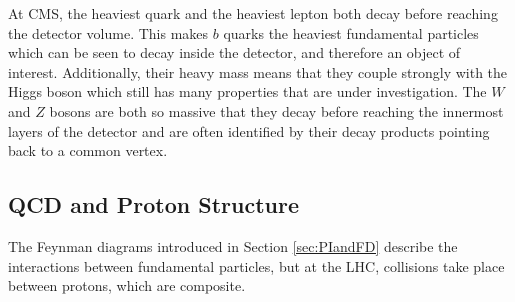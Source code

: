  At CMS, the heaviest quark and the heaviest
  lepton both decay before reaching
  the detector volume.
 This makes $b$ quarks the heaviest
  fundamental particles which can be seen
  to decay inside the detector,
  and therefore an object of interest.
 Additionally, their heavy mass means that they
  couple strongly with the Higgs boson
  which still has many properties that
  are under investigation.
 The $W$ and $Z$ bosons are both so 
  massive that they decay before reaching
  the innermost layers of the detector
  and are often identified by their decay products
  pointing back to a common vertex.
 
\begin{table}[tb]
\caption[Fundamental particle decay channels and rates]
{
 Below are listed the decay channels and 
  rates for each of the unstable
  fundamental particles.
 At CMS, with the detection apparatus
  located a finite distance away from the
  interaction vertex, particles such as the
  $W$, $Z$ and Higgs bosons,
  as well as the $t$ and $tau$, decay before
  reaching the first layer of the detector.
}
\label{tab:lifetimes}
\begin{center}
\end{center}
\end{table}
 

\subsection{QCD and Proton Structure}\label{sec:protonstructure}
 The Feynman diagrams introduced in Section \ref{sec:PIandFD}
  describe the interactions between fundamental particles,
  but at the LHC, collisions take place between
  protons, which are composite.

